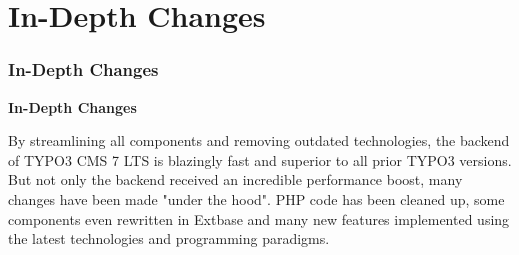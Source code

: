 %

\section{In-Depth Changes}
\begin{frame}[fragile]
	\frametitle{In-Depth Changes}

	\begin{center}\huge{\color{typo3darkgrey}\textbf{In-Depth Changes}}\end{center}

	By streamlining all components and removing outdated technologies, the backend
	of TYPO3 CMS 7 LTS is blazingly fast and superior to all prior TYPO3 versions.\newline
	But not only the backend received an incredible performance boost, many changes have
	been made "under the hood". PHP code has been cleaned up, some components even
	rewritten in Extbase and many new features implemented using the latest technologies
	and programming paradigms.

\end{frame}

